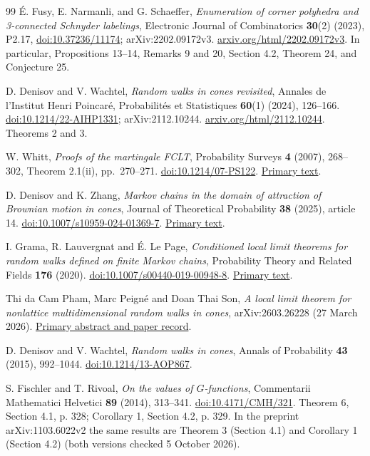 \documentclass[11pt,letterpaper]{article}
\numberwithin{equation}{section}
\theoremstyle{remark}\newtheorem{remark}[theorem]{Remark}
\begin{document}
\clearpage
\begin{thebibliography}{99}
\'E. Fusy, E. Narmanli, and G. Schaeffer,
\emph{Enumeration of corner polyhedra and 3-connected Schnyder labelings},
Electronic Journal of Combinatorics \textbf{30}(2) (2023), P2.17,
\href{https://doi.org/10.37236/11174}{doi:10.37236/11174}; arXiv:2202.09172v3.
\href{https://arxiv.org/html/2202.09172v3}{arxiv.org/html/2202.09172v3}.
In particular, Propositions 13--14, Remarks 9 and 20, Section 4.2, Theorem 24, and Conjecture 25.

D. Denisov and V. Wachtel,
\emph{Random walks in cones revisited},
Annales de l'Institut Henri Poincar\'e, Probabilit\'es et Statistiques
\textbf{60}(1) (2024), 126--166.
\href{https://doi.org/10.1214/22-AIHP1331}{doi:10.1214/22-AIHP1331}; arXiv:2112.10244.
\href{https://arxiv.org/html/2112.10244}{arxiv.org/html/2112.10244}.
Theorems 2 and 3.

W. Whitt, \emph{Proofs of the martingale FCLT}, Probability Surveys
\textbf{4} (2007), 268--302, Theorem 2.1(ii), pp.\ 270--271.
\href{https://doi.org/10.1214/07-PS122}{doi:10.1214/07-PS122}.
\href{https://www.columbia.edu/~ww2040/WWproofs2007pub.pdf}{Primary text}.

D. Denisov and K. Zhang,
\emph{Markov chains in the domain of attraction of Brownian motion in cones},
Journal of Theoretical Probability \textbf{38} (2025), article 14.
\href{https://doi.org/10.1007/s10959-024-01369-7}{doi:10.1007/s10959-024-01369-7}.
\href{https://arxiv.org/html/2309.16311}{Primary text}.

I. Grama, R. Lauvergnat and \'E. Le Page,
\emph{Conditioned local limit theorems for random walks defined on finite Markov chains},
Probability Theory and Related Fields \textbf{176} (2020).
\href{https://doi.org/10.1007/s00440-019-00948-8}{doi:10.1007/s00440-019-00948-8}.
\href{https://arxiv.org/html/1707.06129}{Primary text}.

Thi da Cam Pham, Marc Peign\'e and Doan Thai Son,
\emph{A local limit theorem for nonlattice multidimensional random walks in cones},
arXiv:2603.26228 (27 March 2026).
\href{https://arxiv.org/abs/2603.26228}{Primary abstract and paper record}.

D. Denisov and V. Wachtel,
\emph{Random walks in cones},
Annals of Probability \textbf{43} (2015), 992--1044.
\href{https://doi.org/10.1214/13-AOP867}{doi:10.1214/13-AOP867}.

S. Fischler and T. Rivoal,
\emph{On the values of $G$-functions},
Commentarii Mathematici Helvetici \textbf{89} (2014), 313--341.
\href{https://doi.org/10.4171/CMH/321}{doi:10.4171/CMH/321}.
Theorem 6, Section 4.1, p. 328; Corollary 1, Section 4.2, p. 329.
In the preprint arXiv:1103.6022v2 the same results are Theorem 3 (Section 4.1) and Corollary 1
(Section 4.2) (both versions checked 5 October 2026).


\end{thebibliography}
\end{document}
